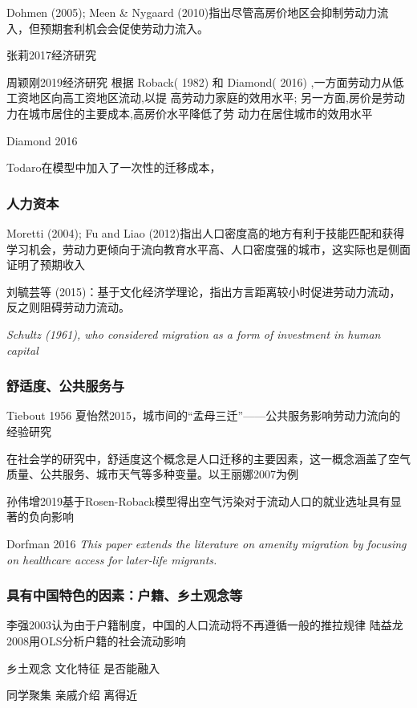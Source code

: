 \documentclass{article}
\numberwithin{equation}{section} %
\begin{document}
Dohmen (2005); Meen \& Nygaard (2010)指出尽管高房价地区会抑制劳动力流入，但预期套利机会会促使劳动力流入。

张莉2017经济研究

周颖刚2019经济研究
	根据 Roback( 1982) 和 Diamond( 2016) ,一方面劳动力从低工资地区向高工资地区流动,以提  高劳动力家庭的效用水平; 另一方面,房价是劳动力在城市居住的主要成本,高房价水平降低了劳  动力在居住城市的效用水平

Diamond 2016

Todaro在模型中加入了一次性的迁移成本，



\subsubsection{人力资本}
Moretti (2004); Fu and Liao (2012)指出人口密度高的地方有利于技能匹配和获得学习机会，劳动力更倾向于流向教育水平高、人口密度强的城市，这实际也是侧面证明了预期收入

刘毓芸等 (2015)：基于文化经济学理论，指出方言距离较小时促进劳动力流动，反之则阻碍劳动力流动。

\textit{Schultz (1961), who considered migration as a form of investment in human capital}


\subsubsection{舒适度、公共服务与}
Tiebout 1956
夏怡然2015，城市间的“孟母三迁”——公共服务影响劳动力流向的经验研究

在社会学的研究中，舒适度这个概念是人口迁移的主要因素，这一概念涵盖了空气质量、公共服务、城市天气等多种变量。以王丽娜2007为例

孙伟增2019基于Rosen-Roback模型得出空气污染对于流动人口的就业选址具有显著的负向影响

Dorfman 2016  
\textit{This paper extends the literature on amenity migration by focusing on healthcare access for later‐life migrants.}

\subsubsection{具有中国特色的因素：户籍、乡土观念等}

李强2003认为由于户籍制度，中国的人口流动将不再遵循一般的推拉规律
陆益龙2008用OLS分析户籍的社会流动影响

乡土观念
文化特征
是否能融入

同学聚集
亲戚介绍
离得近
\end{document}
